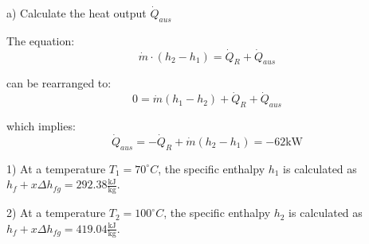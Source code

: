 a) Calculate the heat output \( \dot{Q}_{aus} \)

The equation:
\[ \dot{m} \cdot (h_2 - h_1) = \dot{Q}_R + \dot{Q}_{aus} \]

can be rearranged to:
\[ 0 = \dot{m} (h_1 - h_2) + \dot{Q}_R + \dot{Q}_{aus} \]

which implies:
\[ \dot{Q}_{aus} = -\dot{Q}_R + \dot{m} (h_2 - h_1) = -62 \text{kW} \]

1) At a temperature \( T_1 = 70^\circ C \), the specific enthalpy \( h_1 \) is calculated as \( h_f + x \Delta h_{fg} = 292.38 \frac{\text{kJ}}{\text{kg}} \).

2) At a temperature \( T_2 = 100^\circ C \), the specific enthalpy \( h_2 \) is calculated as \( h_f + x \Delta h_{fg} = 419.04 \frac{\text{kJ}}{\text{kg}} \).
